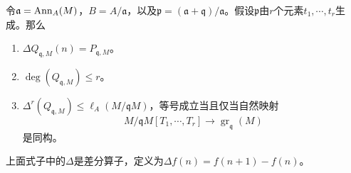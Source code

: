 \begin{proposition}
令$\mathfrak{a} = \operatorname{Ann}_A(M)$，$B = A / \mathfrak{a}$，以及$\mathfrak{p} = (\mathfrak{a} + \mathfrak{q}) / \mathfrak{a}$。假设$\mathfrak{p}$由$r$个元素$t_1,\cdots,t_r$生成。那么
\begin{enumerate}
\item $\Delta Q_{\mathfrak{q},M}(n) = P_{\mathfrak{q},M}$。
\item $\deg(Q_{\mathfrak{q},M}) \leqslant r$。
\item $\Delta^r(Q_{\mathfrak{q},M}) \leqslant \ell_A(M / \mathfrak{q}M)$，等号成立当且仅当自然映射
\[M / \mathfrak{q}M[T_1,\cdots,T_r] \longrightarrow \operatorname{gr}_{\mathfrak{q}}(M)\]
是同构。
\end{enumerate}
上面式子中的$\Delta$是差分算子，定义为$\Delta f(n) = f(n+1) - f(n)$。
\end{proposition}

